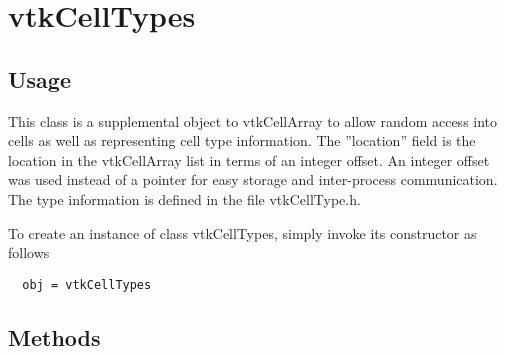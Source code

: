\section{vtkCellTypes}

\subsection{Usage}

 This class is a supplemental object to vtkCellArray to allow random access
 into cells as well as representing cell type information.  The ''location''
 field is the location in the vtkCellArray list in terms of an integer
 offset.  An integer offset was used instead of a pointer for easy storage
 and inter-process communication. The type information is defined in the
 file vtkCellType.h.


To create an instance of class vtkCellTypes, simply
invoke its constructor as follows
\begin{verbatim}
  obj = vtkCellTypes
\end{verbatim}
\subsection{Methods}

